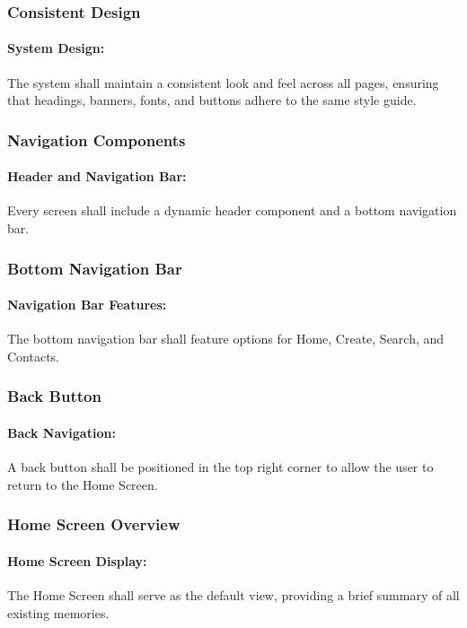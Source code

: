 \documentclass{article}
\begin{document}
\subsubsection*{Consistent Design}
\addtocounter{subsubsection}{1}
\paragraph{System Design:} The system shall maintain a consistent look and feel across all pages, ensuring that headings, banners, fonts, and buttons adhere to the same style guide.
\subsubsection*{Navigation Components}
\addtocounter{subsubsection}{1}
\paragraph{Header and Navigation Bar:} Every screen shall include a dynamic header component and a bottom navigation bar.
\subsubsection*{Bottom Navigation Bar}
\addtocounter{subsubsection}{1}
\paragraph{Navigation Bar Features:} The bottom navigation bar shall feature options for Home, Create, Search, and Contacts.
\subsubsection*{Back Button}
\addtocounter{subsubsection}{1}
\paragraph{Back Navigation:} A back button shall be positioned in the top right corner to allow the user to return to the Home Screen.
\subsubsection*{Home Screen Overview}
\addtocounter{subsubsection}{1}
\paragraph{Home Screen Display:} The Home Screen shall serve as the default view, providing a brief summary of all existing memories.
\end{document}
